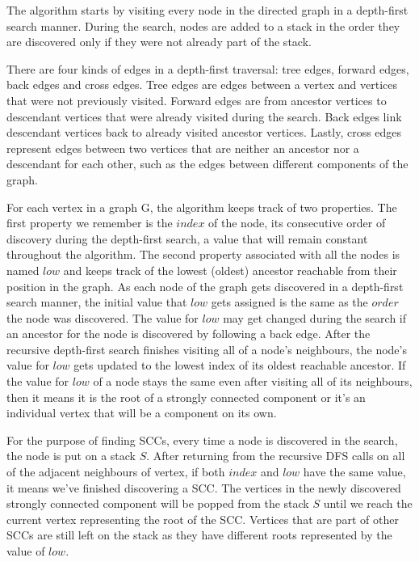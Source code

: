 \documentclass{l4proj}
\begin{document}
\noindent The algorithm starts by visiting every node in the directed graph in a depth-first search manner. During the search, nodes are added to a stack in the order they are discovered only if they were not already part of the stack.

\noindent There are four kinds of edges in a depth-first traversal: tree edges, forward edges, back edges and cross edges. Tree edges are edges between a vertex and vertices that were not previously visited. Forward edges are from ancestor vertices to descendant vertices that were already visited during the search. Back edges link descendant vertices back to already visited ancestor vertices. Lastly, cross edges represent edges between two vertices that are neither an ancestor nor a descendant for each other, such as the edges between different components of the graph. 

\noindent For each vertex in a graph G, the algorithm keeps track of two properties. The first property we remember is the $index$ of the node, its consecutive order of discovery during the depth-first search, a value that will remain constant throughout the algorithm. The second property associated with all the nodes is named $low$ and keeps track of the lowest (oldest) ancestor reachable from their position in the graph. As each node of the graph gets discovered in a depth-first search manner, the initial value that $low$ gets assigned is the same as the $order$ the node was discovered. The value for $low$ may get changed during the search if an ancestor for the node is discovered by following a back edge. After the recursive depth-first search finishes visiting all of a node’s neighbours, the node’s value for $low$ gets updated to the lowest index of its oldest reachable ancestor. If the value for $low$ of a node stays the same even after visiting all of its neighbours, then it means it is the root of a strongly connected component or it’s an individual vertex that will be a component on its own.

\noindent For the purpose of finding SCCs, every time a node is discovered in the search, the node is put on a stack $S$. After returning from the recursive DFS calls on all of the adjacent neighbours of vertex, if both $index$ and $low$ have the same value, it means we’ve finished discovering a SCC. The vertices in the newly discovered strongly connected component will be popped from the stack $S$ until we reach the current vertex representing the root of the SCC. Vertices that are part of other SCCs are still left on the stack as they have different roots represented by the value of $low$.
\end{document}
